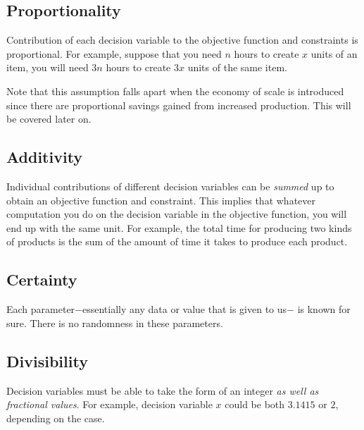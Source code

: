 \subsection*{Proportionality}

Contribution of each decision variable to the objective function and constraints is 
proportional. For example, suppose that you need $n$ hours to create $x$ units of
an item, you will need $3n$ hours to create $3x$ units of the same item.

Note that this assumption falls apart when the economy of scale is introduced since 
there are proportional savings gained from increased production. This will be covered 
later on.

\subsection*{Additivity}

Individual contributions of different decision variables can be \textit{summed} up to 
obtain an objective function and constraint. This implies that whatever computation
you do on the decision variable in the objective function, you will end up with the
same unit. For example, the total time for producing two kinds of products is the sum 
of the amount of time it takes to produce each product.

\subsection*{Certainty}

Each parameter$-$essentially any data or value that is given to us$-$ is known for sure.
There is no randomness in these parameters.

\subsection*{Divisibility}

Decision variables must be able to take the form of an integer \textit{as well as
fractional values}. For example, decision variable $x$ could be both $3.1415$ or $2$,
depending on the case.